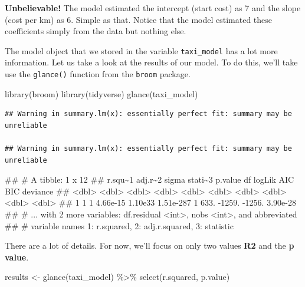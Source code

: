 \documentclass[
]{book}
\newenvironment{Shaded}{\begin{snugshade}}{\end{snugshade}}
\newcommand{\FunctionTok}[1]{\textcolor[rgb]{0.00,0.00,0.00}{#1}}
\newcommand{\NormalTok}[1]{#1}
\newcommand{\OtherTok}[1]{\textcolor[rgb]{0.56,0.35,0.01}{#1}}
\newcommand{\SpecialCharTok}[1]{\textcolor[rgb]{0.00,0.00,0.00}{#1}}
\begin{document}
\textbf{Unbelievable!} The model estimated the intercept (start cost) as 7 and the slope (cost per km) as 6. Simple as that. Notice that the model estimated these coefficients simply from the data but nothing else.

The model object that we stored in the variable \texttt{taxi\_model} has a lot more information. Let us take a look at the results of our model. To do this, we'll take use the \texttt{glance()} function from the \texttt{broom} package.

\begin{Shaded}
\begin{Highlighting}[]
\FunctionTok{library}\NormalTok{(broom)}
\FunctionTok{library}\NormalTok{(tidyverse)}
\FunctionTok{glance}\NormalTok{(taxi\_model)}
\end{Highlighting}
\end{Shaded}

\begin{verbatim}
## Warning in summary.lm(x): essentially perfect fit: summary may be unreliable

## Warning in summary.lm(x): essentially perfect fit: summary may be unreliable
\end{verbatim}

\begin{Shaded}
\begin{Highlighting}[]
\NormalTok{\#\# \# A tibble: 1 x 12}
\NormalTok{\#\#   r.squ\textasciitilde{}1 adj.r\textasciitilde{}2    sigma stati\textasciitilde{}3   p.value    df logLik    AIC    BIC deviance}
\NormalTok{\#\#     \textless{}dbl\textgreater{}   \textless{}dbl\textgreater{}    \textless{}dbl\textgreater{}   \textless{}dbl\textgreater{}     \textless{}dbl\textgreater{} \textless{}dbl\textgreater{}  \textless{}dbl\textgreater{}  \textless{}dbl\textgreater{}  \textless{}dbl\textgreater{}    \textless{}dbl\textgreater{}}
\NormalTok{\#\# 1       1       1 4.66e{-}15 1.10e33 1.51e{-}287     1   633. {-}1259. {-}1256. 3.90e{-}28}
\NormalTok{\#\# \# ... with 2 more variables: df.residual \textless{}int\textgreater{}, nobs \textless{}int\textgreater{}, and abbreviated}
\NormalTok{\#\# \#   variable names 1: r.squared, 2: adj.r.squared, 3: statistic}
\end{Highlighting}
\end{Shaded}

There are a lot of details. For now, we'll focus on only two values \textbf{R2} and the \textbf{p value}.

\begin{Shaded}
\begin{Highlighting}[]
\NormalTok{results }\OtherTok{\textless{}{-}} \FunctionTok{glance}\NormalTok{(taxi\_model) }\SpecialCharTok{\%\textgreater{}\%}
  \FunctionTok{select}\NormalTok{(r.squared, p.value)}
\end{Highlighting}
\end{Shaded}
\end{document}
